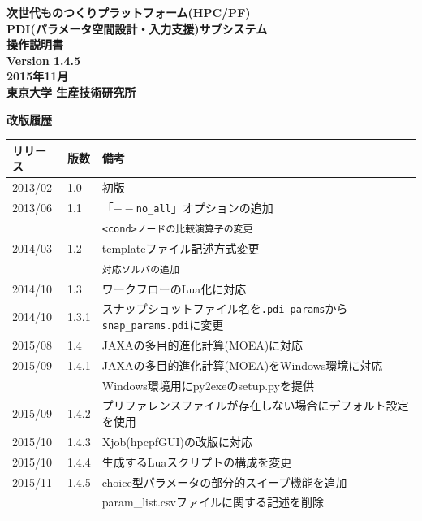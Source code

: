 \documentclass[a4paper,11pt]{jarticle}
\begin{document}
\begin{titlepage}
\vspace*{5cm}
\begin{center}%
{\LARGE \bf 次世代ものつくりプラットフォーム(HPC/PF)\\

PDI(パラメータ空間設計・入力支援)サブシステム\\

操作説明書\\}
\vspace*{2.5cm}
\bf Version 1.4.5\\
\vspace*{1cm}
\bf 2015年11月\\
\vspace*{3.5cm}
{\large\bf 東京大学 生産技術研究所\\}

\end{center}
\end{titlepage}


\newpage

{\Large\bf 改版履歴}

\vspace{12pt}
\begin{tabular}{|l|l|l|} \hline
リリース & 版数 & 備考\hspace*{11cm}\\ \hline
2013/02 & 1.0 & 初版\\ \hline
2013/06 & 1.1 & 「{\tt $--$no\_all}」オプションの追加\\
 & & {\tt <cond>ノードの比較演算子の変更}\\ \hline
2014/03 & 1.2 & templateファイル記述方式変更\\
 & & {\tt 対応ソルバの追加}\\ \hline
2014/10 & 1.3 & ワークフローのLua化に対応\\ \hline
2014/10 & 1.3.1 & スナップショットファイル名を{\tt .pdi\_params}から{\tt snap\_params.pdi}に変更\\ \hline
2015/08 & 1.4 & JAXAの多目的進化計算(MOEA)に対応\\ \hline
2015/09 & 1.4.1 & JAXAの多目的進化計算(MOEA)をWindows環境に対応\\
 & & Windows環境用にpy2exeのsetup.pyを提供\\ \hline
2015/09 & 1.4.2 & プリファレンスファイルが存在しない場合にデフォルト設定を使用\\ \hline
2015/10 & 1.4.3 & Xjob(hpcpfGUI)の改版に対応\\ \hline
2015/10 & 1.4.4 & 生成するLuaスクリプトの構成を変更\\ \hline
2015/11 & 1.4.5 & choice型パラメータの部分的スイープ機能を追加\\
  &  & param\_list.csvファイルに関する記述を削除\\ \hline
\end{tabular}
\end{document}
